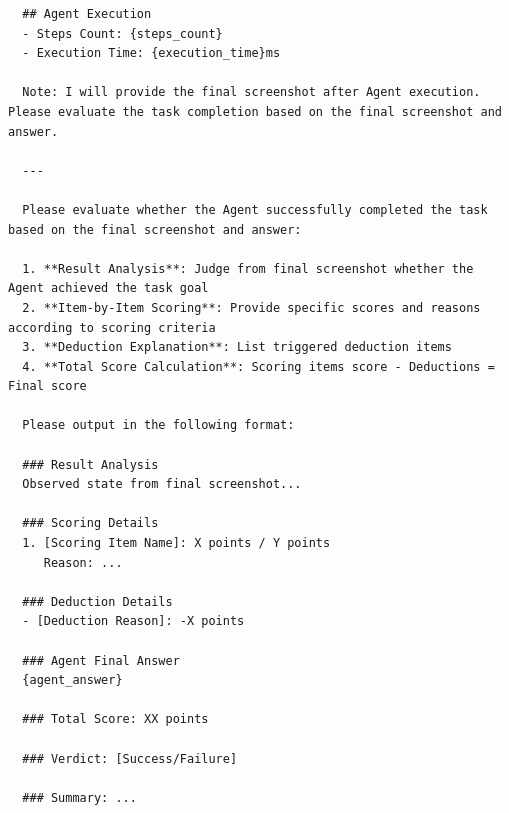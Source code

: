 \begin{tcolorbox}
\begin{lstlisting}
  ## Agent Execution
  - Steps Count: {steps_count}
  - Execution Time: {execution_time}ms

  Note: I will provide the final screenshot after Agent execution. Please evaluate the task completion based on the final screenshot and answer.

  ---

  Please evaluate whether the Agent successfully completed the task based on the final screenshot and answer:

  1. **Result Analysis**: Judge from final screenshot whether the Agent achieved the task goal
  2. **Item-by-Item Scoring**: Provide specific scores and reasons according to scoring criteria
  3. **Deduction Explanation**: List triggered deduction items
  4. **Total Score Calculation**: Scoring items score - Deductions = Final score

  Please output in the following format:

  ### Result Analysis
  Observed state from final screenshot...

  ### Scoring Details
  1. [Scoring Item Name]: X points / Y points
     Reason: ...

  ### Deduction Details
  - [Deduction Reason]: -X points

  ### Agent Final Answer
  {agent_answer}

  ### Total Score: XX points

  ### Verdict: [Success/Failure]

  ### Summary: ...

\end{lstlisting}
\end{tcolorbox}




